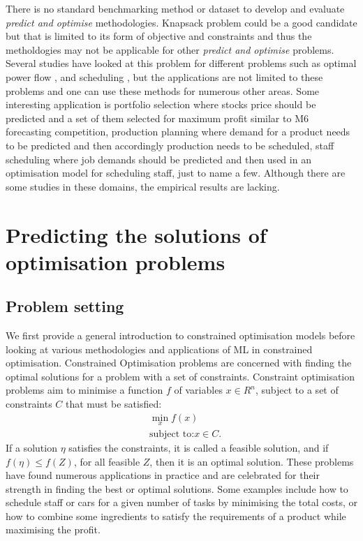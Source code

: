 \documentclass[graybox]{svmult}
\begin{document}
There is no standard benchmarking method or dataset to develop and evaluate \textit{predict and optimise} methodologies. Knapsack problem \cite{mandi2020smart} could be a good candidate but that is limited to its form of objective and constraints and thus the metholdogies may not be applicable for other \textit{predict and optimise} problems. Several studies have looked at this problem for different problems such as optimal power flow \cite{chatzos2020high}, and scheduling \cite{abolghasemi2021state}, but the applications are not limited to these problems and one can use these methods for numerous other areas.  Some interesting application is portfolio selection where stocks price should be predicted and a set of them selected for maximum profit similar to M6 forecasting competition, production planning where demand for a product needs to be predicted and then accordingly production needs to be scheduled, staff scheduling where job demands should be predicted and then used in an optimisation model for scheduling staff, just to name a few. Although there are some studies in these domains, the empirical results are lacking.




\section{Predicting the solutions of optimisation problems}\label{sec:predictopt}

\subsection{Problem setting}\label{problem2}

We first provide a general introduction to constrained optimisation models before looking at various methodologies and applications of ML in constrained optimisation. Constrained Optimisation problems are concerned with finding the optimal solutions for a problem with a set of constraints. Constraint optimisation problems aim to minimise a function $f$ of variables $x \in R^n$, subject to a set of constraints $C$ that must be satisfied:
\begin{align}
&\min_{x}f(x) ~\\ \nonumber
& \text{subject~to:} x \in C. 
\end{align}
If a solution $\eta$ satisfies the constraints, it is called a feasible solution, and if $f(\eta) \leq f(Z) $, for all feasible $Z$, then it is an optimal solution. These problems have found numerous applications in practice and are celebrated for their strength in finding the best or optimal solutions. Some examples include how to schedule staff or cars for a given number of tasks by minimising the total costs, or how to combine some ingredients to satisfy the requirements of a product while maximising the profit. 
\end{document}

